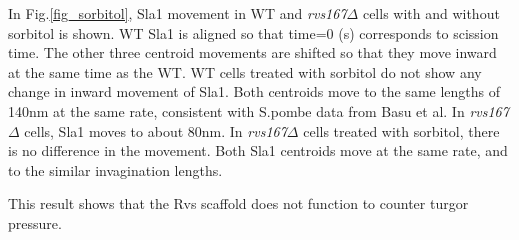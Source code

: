 In Fig.\ref{fig_sorbitol}, Sla1 movement in WT and \textit{rvs167$\Delta$} cells with and without sorbitol is shown. WT Sla1 is aligned so that time=0 (s) corresponds to scission time. The other three centroid movements are shifted so that they move inward at the same time as the WT. WT cells treated with sorbitol do not show any change in inward movement of Sla1. Both centroids move to the same lengths of 140nm at the same rate, consistent with S.pombe data from Basu et al. In \textit{rvs167$\Delta$} cells, Sla1 moves to about 80nm. In \textit{rvs167$\Delta$} cells treated with sorbitol, there is no difference in the movement. Both Sla1 centroids move at the same rate, and to the similar invagination lengths.

This result shows that the Rvs scaffold does not function to counter turgor pressure.  



